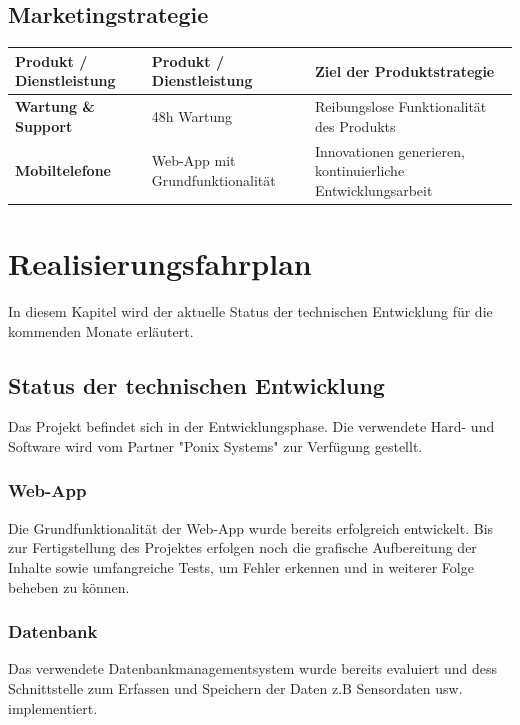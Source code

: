 \documentclass[11pt]{article}
\begin{document}
\subsection{Marketingstrategie}

\begin{tabulary}{\columnwidth}{| J | J | J |}
\hline
\textbf{Produkt / Dienstleistung} & \textbf{Produkt / Dienstleistung} & \textbf{Ziel der Produktstrategie}\\
\hline
\textbf{Wartung \& Support} & 48h Wartung & Reibungslose Funktionalit\"at des Produkts \\
\hline
\textbf{Mobiltelefone} & Web-App
mit Grundfunktionalit\"at & Innovationen generieren, kontinuierliche Entwicklungsarbeit \\
\hline
\end{tabulary}

\section{Realisierungsfahrplan}
In diesem Kapitel wird der aktuelle Status der technischen Entwicklung f\"ur die kommenden Monate erl\"autert.

\subsection{Status der technischen Entwicklung}

Das Projekt befindet sich in der Entwicklungsphase. Die verwendete Hard- und Software
wird vom Partner "Ponix Systems" zur Verf\"ugung gestellt.

\subsubsection{Web-App}

Die Grundfunktionalit\"at der Web-App wurde bereits erfolgreich entwickelt. Bis zur Fertigstellung des Projektes erfolgen noch die grafische Aufbereitung der Inhalte sowie umfangreiche Tests, um Fehler erkennen und in weiterer Folge beheben zu k\"onnen.

\subsubsection{Datenbank}

Das verwendete Datenbankmanagementsystem wurde bereits evaluiert und dess Schnittstelle zum Erfassen und Speichern der Daten z.B Sensordaten usw. implementiert.
\end{document}

